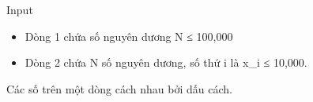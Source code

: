 Input
\begin{itemize}
	\item Dòng 1 chứa số nguyên dương N ≤ 100,000
	\item Dòng 2 chứa N số nguyên dương, số thứ i là x\_i ≤ 10,000.
\end{itemize}

Các số trên một dòng cách nhau bởi dấu cách.